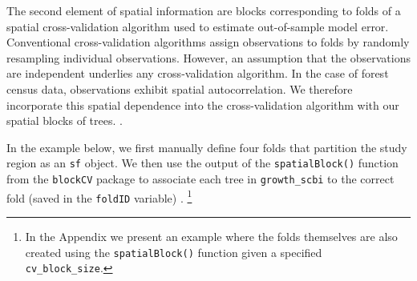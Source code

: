 \documentclass[12pt]{article}
\begin{document}
The second element of spatial information are blocks corresponding to
folds of a spatial cross-validation algorithm used to estimate
out-of-sample model error. Conventional cross-validation algorithms
assign observations to folds by randomly resampling individual
observations. However, an assumption that the observations are
independent underlies any cross-validation algorithm. In the case of
forest census data, observations exhibit spatial autocorrelation. We
therefore incorporate this spatial dependence into the cross-validation
algorithm with our spatial blocks of trees.
\citet{roberts_cross-validation_2017}
\citet{pohjankukka_estimating_2017}.

In the example below, we first manually define four folds that partition
the study region as an \texttt{sf} object. We then use the output of the
\texttt{spatialBlock()} function from the \texttt{blockCV} package to
associate each tree in \texttt{growth\_scbi} to the correct fold (saved
in the \texttt{foldID} variable) \citet{valavi_blockcv_2019}. \footnote{In
  the Appendix we present an example where the folds themselves are also
  created using the \texttt{spatialBlock()} function given a specified
  \texttt{cv\_block\_size}.}
\end{document}
